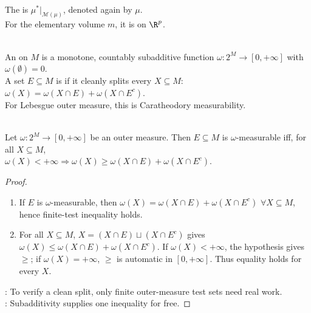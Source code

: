 \begin{definition} \label{def:extended-and-lebesgue-measure} \\
The  is $\mu^\ast|_{\mathcal{M}(\mu)}$, denoted again by $\mu$.\\
For the elementary volume $m$, it is  on $\R^p$.
\end{definition}

\begin{definition} \label{def:abstract-outer-measure-clean-division} \\
An  on $M$ is a monotone, countably subadditive function $\omega:2^M\to[0,+\infty]$ with $\omega(\emptyset)=0$.\\
A set $E\subseteq M$ is  if it cleanly splits every $X\subseteq M$: $\omega(X)=\omega(X\cap E)+\omega(X\cap E^c)$.\\
For Lebesgue outer measure, this is Caratheodory measurability.
\end{definition}

\begin{lemma} \label{lem:caratheodory-finite-measure-test} \\
Let $\omega:2^M\to[0,+\infty]$ be an outer measure. Then $E\subseteq M$ is $\omega$-measurable iff, for all $X\subseteq M$,\\
$\omega(X)<+\infty\Longrightarrow \omega(X)\geq\omega(X\cap E)+\omega(X\cap E^c)$.
\begin{proof}
\begin{enumerate}[label=\roman*.]
\setlength{\itemsep}{0pt}
\item[$(\Rightarrow)$] If $E$ is $\omega$-measurable, then $\omega(X)=\omega(X\cap E)+\omega(X\cap E^c)$ $\forall X\subseteq M$, hence finite-test inequality holds.
\item[$(\Leftarrow)$] For all $X\subseteq M$, $X=(X\cap E)\sqcup(X\cap E^c)$ gives $\omega(X)\leq\omega(X\cap E)+\omega(X\cap E^c)$. If $\omega(X)<+\infty$, the hypothesis gives $\geq$; if $\omega(X)=+\infty$, $\geq$ is automatic in $[0,+\infty]$. Thus equality holds for every $X$.
\end{enumerate}
: To verify a clean split, only finite outer-measure test sets need real work.\\
: Subadditivity supplies one inequality for free.
\end{proof}
\end{lemma}

